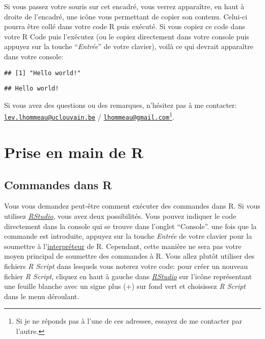 \documentclass[
]{book}
\begin{document}
Si vous passez votre souris sur cet encadré, vous verrez apparaître, en haut à droite de l'encadré, une icône vous permettant de copier son contenu. Celui-ci pourra être collé dans votre code R puis exécuté. Si vous copiez ce code dans votre R Code puis l'exécutez (ou le copiez directement dans votre console puis appuyez sur la touche ``\emph{Entrée}'' de votre clavier), voilà ce qui devrait apparaître dans votre console:

\begin{verbatim}
## [1] "Hello world!"
\end{verbatim}

\begin{verbatim}
## Hello world!
\end{verbatim}

Si vous avez des questions ou des remarques, n'hésitez pas à me contacter: \href{mailto:lev.lhommeau@uclouvain.be}{\nolinkurl{lev.lhommeau@uclouvain.be}} / \href{mailto:lhommeau@gmail.com}{\nolinkurl{lhommeau@gmail.com}}\footnote{Si je ne réponds pas à l'une de ces adresses, essayez de me contacter par l'autre.}.

\hypertarget{Priseenmain}{%
\chapter{Prise en main de R}\label{Priseenmain}}

\hypertarget{Commandes}{%
\section{Commandes dans R}\label{Commandes}}

Vous vous demandez peut-être comment exécuter des commandes dans R. Si vous utilisez \href{https://posit.co/}{\emph{RStudio}}, vous avez deux possibilités. Vous pouvez indiquer le code directement dans la console qui se trouve dans l'onglet ``Console''. une fois que la commande est introduite, appuyez sur la touche \emph{Entrée} de votre clavier pour la soumettre à l'\href{https://fr.wikipedia.org/wiki/Interpr\%C3\%A8te_(informatique)}{interpréteur} de R. Cependant, cette manière ne sera pas votre moyen principal de soumettre des commandes à R. Vous allez plutôt utiliser des fichiers \emph{R Script} dans lesquels vous noterez votre code: pour créer un nouveau fichier \emph{R Script}, cliquez en haut à gauche dans \href{https://posit.co/}{\emph{RStudio}} sur l'icône représentant une feuille blanche avec un signe plus (+) sur fond vert et choisissez \emph{R Script} dans le menu déroulant.
\end{document}
